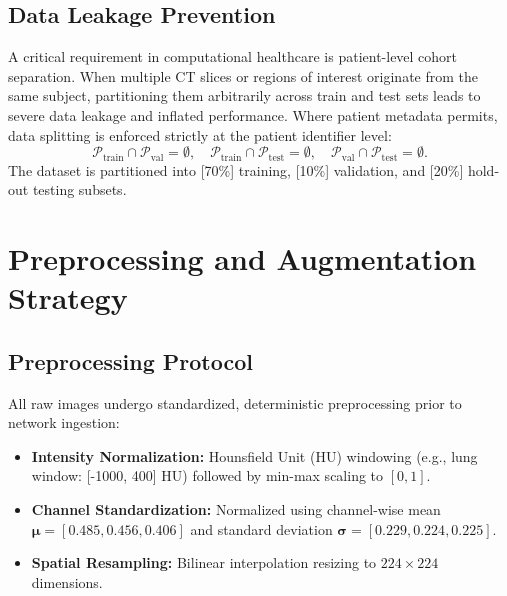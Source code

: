 \documentclass[conference]{IEEEtran}
\begin{document}
\subsection{Data Leakage Prevention}
A critical requirement in computational healthcare is patient-level cohort separation. When multiple CT slices or regions of interest originate from the same subject, partitioning them arbitrarily across train and test sets leads to severe data leakage and inflated performance. Where patient metadata permits, data splitting is enforced strictly at the patient identifier level:
\begin{equation}
\mathcal{P}_{\text{train}} \cap \mathcal{P}_{\text{val}} = \emptyset, \quad \mathcal{P}_{\text{train}} \cap \mathcal{P}_{\text{test}} = \emptyset, \quad \mathcal{P}_{\text{val}} \cap \mathcal{P}_{\text{test}} = \emptyset.
\end{equation}
The dataset is partitioned into [70\%] training, [10\%] validation, and [20\%] hold-out testing subsets.

\section{Preprocessing and Augmentation Strategy}
\label{sec:preprocessing}

\subsection{Preprocessing Protocol}
All raw images undergo standardized, deterministic preprocessing prior to network ingestion:
\begin{itemize}
    \item \textbf{Intensity Normalization:} Hounsfield Unit (HU) windowing (e.g., lung window: [-1000, 400] HU) followed by min-max scaling to $[0, 1]$.
    \item \textbf{Channel Standardization:} Normalized using channel-wise mean $\boldsymbol{\mu} = [0.485, 0.456, 0.406]$ and standard deviation $\boldsymbol{\sigma} = [0.229, 0.224, 0.225]$.
    \item \textbf{Spatial Resampling:} Bilinear interpolation resizing to $224 \times 224$ dimensions.
\end{itemize}
\end{document}
